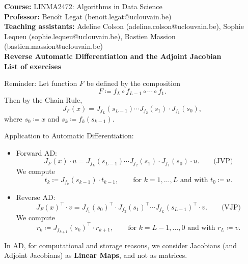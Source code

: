 \documentclass{article}
\theoremstyle{definition}
\theoremstyle{remark}
\begin{document}
\noindent\textbf{Course:} LINMA2472: Algorithms in Data Science
\\[0.2cm]
\noindent\textbf{Professor:} Benoît Legat (benoit.legat@uclouvain.be)
\\[0.2cm]
\noindent\textbf{Teaching assistants:} Adeline Colson (adeline.colson@uclouvain.be), Sophie Lequeu (sophie.lequeu@uclouvain.be), Bastien Massion (bastien.massion@uclouvain.be)
\\[0.2cm]

\Large \noindent\textbf{Reverse Automatic Differentiation and the Adjoint Jacobian} \\

\normalsize \noindent\textbf{List of exercises}

\begin{boxA}
    Reminder: Let function $F$ be defined by the composition
    \[
    F \coloneqq f_L \circ f_{L-1} \circ \cdots \circ f_1.
    \]
    Then by the Chain Rule,
    \[
    J_F(x)
    =
    J_{f_L}(s_{L-1})\cdots J_{f_2}(s_1) \cdot J_{f_1}(s_0),
    \]
    where $s_0 \coloneqq x$ and $s_k \coloneqq f_k(s_{k-1})$.
\end{boxA}

\begin{boxB}
    Application to Automatic Differentiation: 
    \begin{itemize}
        \item Forward AD: 
        \[
        J_F(x) \cdot u
        =
        J_{f_L}(s_{L-1})\cdots J_{f_2}(s_1) \cdot J_{f_1}(s_0) \cdot u. \qquad \text{(JVP)}
        \]
        We compute
        \begin{equation*}
            t_k \coloneqq J_{f_k}(s_{k-1}) \cdot t_{k-1}, \qquad \text{for } k = 1, \dots, L \text{ and  with } t_0 \coloneqq u.
        \end{equation*}
        \item Reverse AD: 
        \[
        J_F(x)^\top \cdot v
        =
          J_{f_1}(s_0)^\top \cdot J_{f_2}(s_1)^\top \cdots J_{f_L}(s_{L-1})^\top \cdot v. \qquad \text{(VJP)}
        \]
        We compute
        \begin{equation*}
            r_k \coloneqq J_{f_{k+1}}(s_{k})^\top \cdot r_{k+1}, \qquad \text{for } k = L-1, \dots, 0 \text{ and  with } r_L \coloneqq v.
            \end{equation*}
    \end{itemize}
    In AD, for computational and storage reasons, we consider Jacobians (and Adjoint Jacobians) as \textbf{Linear Maps}, and not as matrices.
\end{boxB}
    
\end{document}
